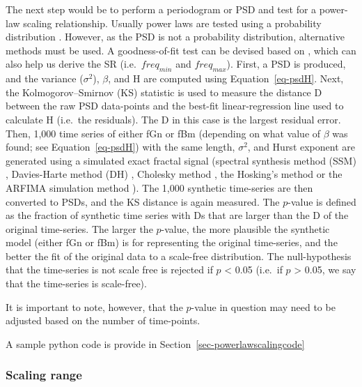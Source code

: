 \documentclass[
  sn-vancouver,
  Numbered,
  referee,
  lineno]{sn-jnl}
\begin{document}
The next step would be to perform a periodogram or PSD and test for a
power-law scaling relationship. Usually power laws are tested using a
probability distribution
\citep{clausetPowerLawDistributionsEmpirical2009}. However, as the PSD
is not a probability distribution, alternative methods must be used. A
goodness-of-fit test can be devised based on
\citet{clausetPowerLawDistributionsEmpirical2009}, which can also help
us derive the SR (i.e.~\(freq_{min}\) and \(freq_{max}\)). First, a PSD
is produced, and the variance (\(\sigma^2\)), \(\beta\), and H are
computed using Equation~\ref{eq-psdH}. Next, the Kolmogorov--Smirnov
(KS) statistic
\citep{kolmogorovSullaDeterminazioneEmpirica1933, smirnovTableEstimatingGoodness1948}
is used to measure the distance D between the raw PSD data-points and
the best-fit linear-regression line used to calculate H (i.e.~the
residuals). The D in this case is the largest residual error. Then,
1,000 time series of either fGn or fBm (depending on what value of
\(\beta\) was found; see Equation~\ref{eq-psdH}) with the same length,
\(\sigma^2\), and Hurst exponent are generated using a simulated exact
fractal signal (spectral synthesis method (SSM)
\citep{peitgenScienceFractalImages1988}, Davies-Harte method (DH)
\citep{daviesTestsHurstEffect1987}, Cholesky method
\citep{asmussenStochasticSimulationView1998}, the Hosking's method
\citep{hoskingModelingPersistenceHydrological1984} or the ARFIMA
simulation method
\citep{roumeBiasesSimulationAnalysis2019, grangerINTRODUCTIONLONGMEMORYTIME1980}).
The 1,000 synthetic time-series are then converted to PSDs, and the KS
distance is again measured. The \(p\)-value is defined as the fraction
of synthetic time series with Ds that are larger than the D of the
original time-series. The larger the \(p\)-value, the more plausible the
synthetic model (either fGn or fBm) is for representing the original
time-series, and the better the fit of the original data to a scale-free
distribution. The null-hypothesis that the time-series is not scale free
is rejected if \(p\) \textless{} 0.05 (i.e.~if \(p\) \textgreater{}
0.05, we say that the time-series is scale-free).

It is important to note, however, that the \(p\)-value in question may
need to be adjusted based on the number of time-points.

A sample python code is provide in Section~\ref{sec-powerlawscalingcode}

\subsubsection{Scaling range}\label{scaling-range-1}
\end{document}
